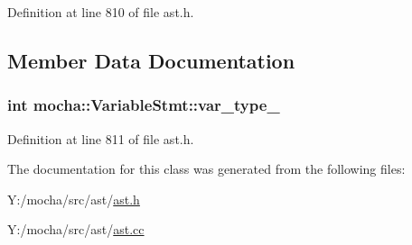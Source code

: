 Definition at line 810 of file ast.h.



\subsection{Member Data Documentation}
\hypertarget{classmocha_1_1_variable_stmt_a3fb082b5bf7002e4a647682f68e2033c}{
\subsubsection[{var\_\-type\_\-}]{\setlength{\rightskip}{0pt plus 5cm}int {\bf mocha::VariableStmt::var\_\-type\_\-}}}
\label{classmocha_1_1_variable_stmt_a3fb082b5bf7002e4a647682f68e2033c}


Definition at line 811 of file ast.h.



The documentation for this class was generated from the following files:\begin{DoxyCompactItemize}
\item 
Y:/mocha/src/ast/\hyperlink{ast_8h}{ast.h}\item 
Y:/mocha/src/ast/\hyperlink{ast_8cc}{ast.cc}\end{DoxyCompactItemize}
